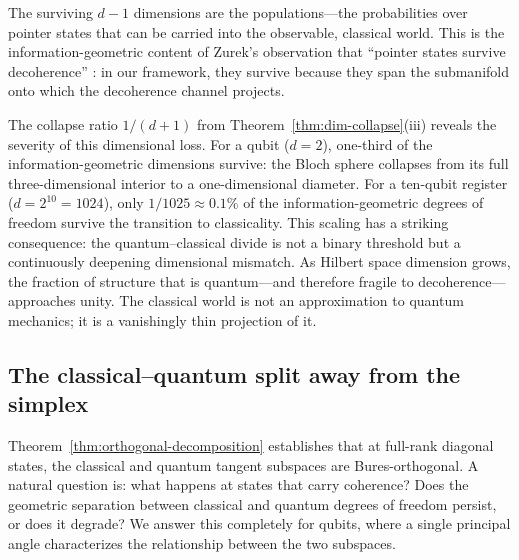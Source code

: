 \documentclass[12pt,a4paper]{article}
\theoremstyle{definition}
\theoremstyle{remark}
\begin{document}
The surviving $d - 1$ dimensions are the populations---the probabilities over pointer states that can be carried into the observable, classical world. This is the information-geometric content of Zurek's observation that ``pointer states survive decoherence'' \cite{zurek2003decoherence}: in our framework, they survive because they span the submanifold onto which the decoherence channel projects.

The collapse ratio $1/(d+1)$ from Theorem~\ref{thm:dim-collapse}(iii) reveals the severity of this dimensional loss. For a qubit ($d = 2$), one-third of the information-geometric dimensions survive: the Bloch sphere collapses from its full three-dimensional interior to a one-dimensional diameter. For a ten-qubit register ($d = 2^{10} = 1024$), only $1/1025 \approx 0.1\%$ of the information-geometric degrees of freedom survive the transition to classicality. This scaling has a striking consequence: the quantum--classical divide is not a binary threshold but a continuously deepening dimensional mismatch. As Hilbert space dimension grows, the fraction of structure that is quantum---and therefore fragile to decoherence---approaches unity. The classical world is not an approximation to quantum mechanics; it is a vanishingly thin projection of it.

\subsection{The classical--quantum split away from the simplex}
\label{sec:bures-angle}

Theorem~\ref{thm:orthogonal-decomposition} establishes that at full-rank diagonal states, the classical and quantum tangent subspaces are Bures-orthogonal.  A natural question is: what happens at states that carry coherence?  Does the geometric separation between classical and quantum degrees of freedom persist, or does it degrade?  We answer this completely for qubits, where a single principal angle characterizes the relationship between the two subspaces.
\end{document}
